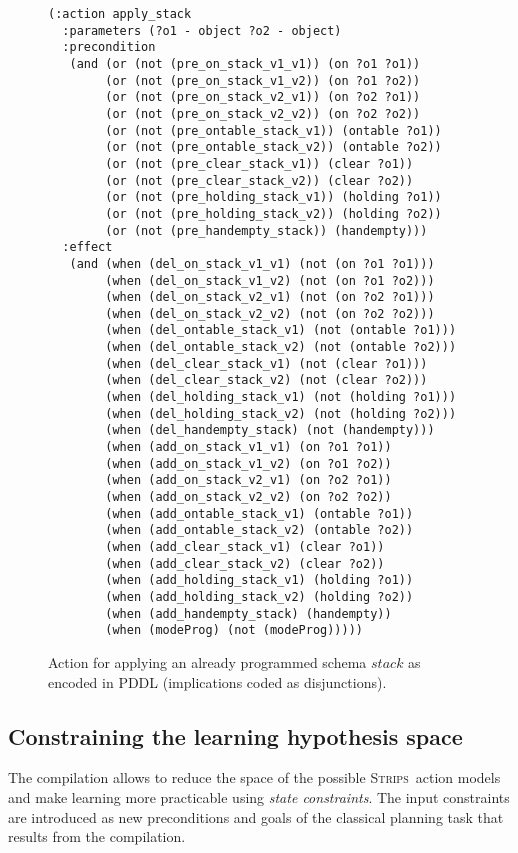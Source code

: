\documentclass{article}
\newcommand{\strips}{\textsc{Strips}}     %
\begin{document}
\begin{figure}[hbt!]
\begin{scriptsize}
\begin{verbatim}
(:action apply_stack
  :parameters (?o1 - object ?o2 - object)
  :precondition
   (and (or (not (pre_on_stack_v1_v1)) (on ?o1 ?o1))
        (or (not (pre_on_stack_v1_v2)) (on ?o1 ?o2))
        (or (not (pre_on_stack_v2_v1)) (on ?o2 ?o1))
        (or (not (pre_on_stack_v2_v2)) (on ?o2 ?o2))
        (or (not (pre_ontable_stack_v1)) (ontable ?o1))
        (or (not (pre_ontable_stack_v2)) (ontable ?o2))
        (or (not (pre_clear_stack_v1)) (clear ?o1))
        (or (not (pre_clear_stack_v2)) (clear ?o2))
        (or (not (pre_holding_stack_v1)) (holding ?o1))
        (or (not (pre_holding_stack_v2)) (holding ?o2))
        (or (not (pre_handempty_stack)) (handempty)))
  :effect
   (and (when (del_on_stack_v1_v1) (not (on ?o1 ?o1)))
        (when (del_on_stack_v1_v2) (not (on ?o1 ?o2)))
        (when (del_on_stack_v2_v1) (not (on ?o2 ?o1)))
        (when (del_on_stack_v2_v2) (not (on ?o2 ?o2)))
        (when (del_ontable_stack_v1) (not (ontable ?o1)))
        (when (del_ontable_stack_v2) (not (ontable ?o2)))
        (when (del_clear_stack_v1) (not (clear ?o1)))
        (when (del_clear_stack_v2) (not (clear ?o2)))
        (when (del_holding_stack_v1) (not (holding ?o1)))
        (when (del_holding_stack_v2) (not (holding ?o2)))
        (when (del_handempty_stack) (not (handempty)))
        (when (add_on_stack_v1_v1) (on ?o1 ?o1))
        (when (add_on_stack_v1_v2) (on ?o1 ?o2))
        (when (add_on_stack_v2_v1) (on ?o2 ?o1))
        (when (add_on_stack_v2_v2) (on ?o2 ?o2))
        (when (add_ontable_stack_v1) (ontable ?o1))
        (when (add_ontable_stack_v2) (ontable ?o2))
        (when (add_clear_stack_v1) (clear ?o1))
        (when (add_clear_stack_v2) (clear ?o2))
        (when (add_holding_stack_v1) (holding ?o1))
        (when (add_holding_stack_v2) (holding ?o2))
        (when (add_handempty_stack) (handempty))
        (when (modeProg) (not (modeProg)))))
\end{verbatim}
\end{scriptsize}
 \caption{\small Action for applying an already programmed schema $stack$ as encoded in PDDL (implications coded as disjunctions).}
\label{fig:compilation}
\end{figure}

\subsection{Constraining the learning hypothesis space}
The compilation allows to reduce the space of the possible \strips\ action models and make learning more practicable using {\em state constraints}. The input constraints are introduced as new preconditions and goals of the classical planning task that results from the compilation. 
\end{document}
